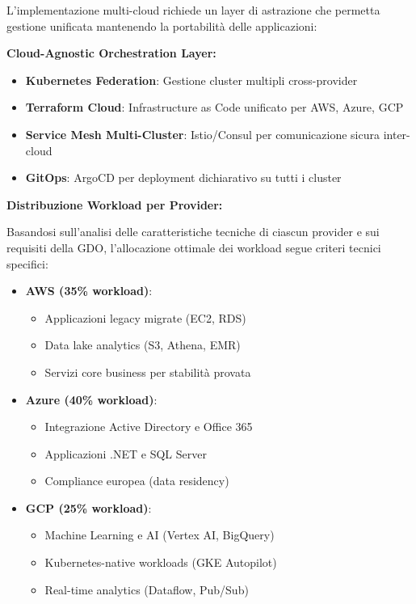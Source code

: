 L'implementazione multi-cloud richiede un layer di astrazione che permetta gestione unificata mantenendo la portabilità delle applicazioni:

\textbf{Cloud-Agnostic Orchestration Layer:}
\begin{itemize}
    \item \textbf{Kubernetes Federation}: Gestione cluster multipli cross-provider
    \item \textbf{Terraform Cloud}: Infrastructure as Code unificato per AWS, Azure, GCP
    \item \textbf{Service Mesh Multi-Cluster}: Istio/Consul per comunicazione sicura inter-cloud
    \item \textbf{GitOps}: ArgoCD per deployment dichiarativo su tutti i cluster
\end{itemize}

\textbf{Distribuzione Workload per Provider:}

Basandosi sull'analisi delle caratteristiche tecniche di ciascun provider e sui requisiti della GDO, l'allocazione ottimale dei workload segue criteri tecnici specifici:

\begin{itemize}
    \item \textbf{AWS (35\% workload)}:
    \begin{itemize}
        \item Applicazioni legacy migrate (EC2, RDS)
        \item Data lake analytics (S3, Athena, EMR)
        \item Servizi core business per stabilità provata
    \end{itemize}
    
    \item \textbf{Azure (40\% workload)}:
    \begin{itemize}
        \item Integrazione Active Directory e Office 365
        \item Applicazioni .NET e SQL Server
        \item Compliance europea (data residency)
    \end{itemize}
    
    \item \textbf{GCP (25\% workload)}:
    \begin{itemize}
        \item Machine Learning e AI (Vertex AI, BigQuery)
        \item Kubernetes-native workloads (GKE Autopilot)
        \item Real-time analytics (Dataflow, Pub/Sub)
    \end{itemize}
\end{itemize}

